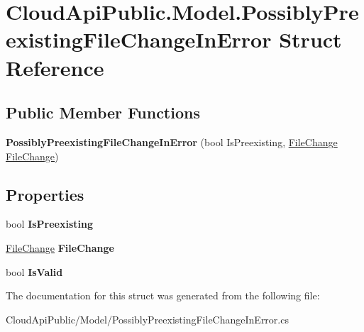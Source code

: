 \hypertarget{struct_cloud_api_public_1_1_model_1_1_possibly_preexisting_file_change_in_error}{\section{Cloud\-Api\-Public.\-Model.\-Possibly\-Preexisting\-File\-Change\-In\-Error Struct Reference}
\label{struct_cloud_api_public_1_1_model_1_1_possibly_preexisting_file_change_in_error}
}
\subsection*{Public Member Functions}
\begin{DoxyCompactItemize}
\item 
\hypertarget{struct_cloud_api_public_1_1_model_1_1_possibly_preexisting_file_change_in_error_ab97b184b14d21e8ff4b1b086ff978cac}{{\bfseries Possibly\-Preexisting\-File\-Change\-In\-Error} (bool Is\-Preexisting, \hyperlink{class_cloud_api_public_1_1_model_1_1_file_change}{File\-Change} \hyperlink{class_cloud_api_public_1_1_model_1_1_file_change}{File\-Change})}\label{struct_cloud_api_public_1_1_model_1_1_possibly_preexisting_file_change_in_error_ab97b184b14d21e8ff4b1b086ff978cac}

\end{DoxyCompactItemize}
\subsection*{Properties}
\begin{DoxyCompactItemize}
\item 
\hypertarget{struct_cloud_api_public_1_1_model_1_1_possibly_preexisting_file_change_in_error_a2e376153a8a6e9a7c3d74ae622dc48bf}{bool {\bfseries Is\-Preexisting}}\label{struct_cloud_api_public_1_1_model_1_1_possibly_preexisting_file_change_in_error_a2e376153a8a6e9a7c3d74ae622dc48bf}

\item 
\hypertarget{struct_cloud_api_public_1_1_model_1_1_possibly_preexisting_file_change_in_error_ad72c7a1d76ce96d73c2088f86c4aa2ea}{\hyperlink{class_cloud_api_public_1_1_model_1_1_file_change}{File\-Change} {\bfseries File\-Change}}\label{struct_cloud_api_public_1_1_model_1_1_possibly_preexisting_file_change_in_error_ad72c7a1d76ce96d73c2088f86c4aa2ea}

\item 
\hypertarget{struct_cloud_api_public_1_1_model_1_1_possibly_preexisting_file_change_in_error_ac9329005d8bf57a9c5710bdc95214348}{bool {\bfseries Is\-Valid}}\label{struct_cloud_api_public_1_1_model_1_1_possibly_preexisting_file_change_in_error_ac9329005d8bf57a9c5710bdc95214348}

\end{DoxyCompactItemize}


The documentation for this struct was generated from the following file\-:\begin{DoxyCompactItemize}
\item 
Cloud\-Api\-Public/\-Model/Possibly\-Preexisting\-File\-Change\-In\-Error.\-cs\end{DoxyCompactItemize}
